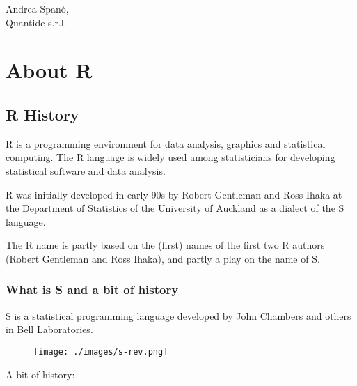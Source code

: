 \documentclass[]{book}
\begin{document}
Andrea Spanò,\\
Quantide s.r.l.

\chapter{About R}\label{about-r}

\section{R History}\label{r-history}

R is a programming environment for data analysis, graphics and
statistical computing. The R language is widely used among statisticians
for developing statistical software and data analysis.

R was initially developed in early 90s by Robert Gentleman and Ross
Ihaka at the Department of Statistics of the University of Auckland as a
dialect of the S language.

The R name is partly based on the (first) names of the first two R
authors (Robert Gentleman and Ross Ihaka), and partly a play on the name
of S.

\clearpage

\subsection{What is S and a bit of
history}\label{what-is-s-and-a-bit-of-history}

S is a statistical programming language developed by John Chambers and
others in Bell Laboratories.

\begin{figure}[htbp]
\centering
\texttt{[image: ./images/s-rev.png]}
\caption{}
\end{figure}

A bit of history:
\end{document}
